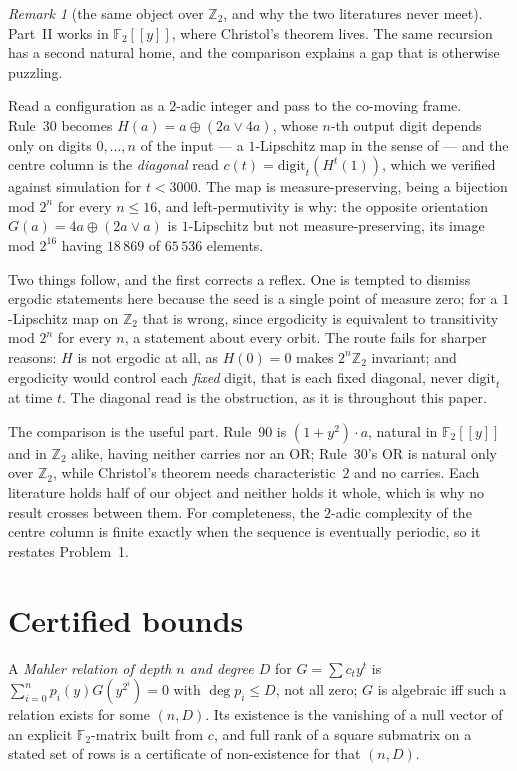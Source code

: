 \documentclass[11pt]{article}
\theoremstyle{definition}
\theoremstyle{remark}
\newtheorem{remark}[theorem]{Remark}
\newcommand{\Z}{\mathbb{Z}}
\newcommand{\F}{\mathbb{F}_2}
\begin{document}
\begin{remark}[the same object over $\Z_2$, and why the two literatures never meet]\label{du:padic}
Part~II works in $\F[[y]]$, where Christol's theorem lives. The same recursion has a second natural
home, and the comparison explains a gap that is otherwise puzzling.

Read a configuration as a $2$-adic integer and pass to the co-moving frame. Rule~30 becomes
$H(a)=a\oplus(2a\vee4a)$, whose $n$-th output digit depends only on digits $0,\dots,n$ of the input ---
a $1$-Lipschitz map in the sense of \cite{Anashin} --- and the centre column is the \emph{diagonal}
read $c(t)=\mathrm{digit}_t(H^{t}(1))$, which we verified against simulation for $t<3000$. The map is
measure-preserving, being a bijection mod $2^{n}$ for every $n\le16$, and left-permutivity is why: the
opposite orientation $G(a)=4a\oplus(2a\vee a)$ is $1$-Lipschitz but not measure-preserving, its image
mod $2^{16}$ having $18\,869$ of $65\,536$ elements.

Two things follow, and the first corrects a reflex. One is tempted to dismiss ergodic statements here
because the seed is a single point of measure zero; for a $1$-Lipschitz map on $\Z_2$ that is wrong,
since ergodicity is equivalent to transitivity mod $2^{n}$ for every $n$, a statement about every orbit.
The route fails for sharper reasons: $H$ is not ergodic at all, as $H(0)=0$ makes $2^{n}\Z_2$ invariant;
and ergodicity would control each \emph{fixed} digit, that is each fixed diagonal, never
$\mathrm{digit}_t$ at time $t$. The diagonal read is the obstruction, as it is throughout this paper.

The comparison is the useful part. Rule~90 is $(1+y^{2})\cdot a$, natural in $\F[[y]]$ and in $\Z_2$
alike, having neither carries nor an OR; Rule~30's OR is natural only over $\Z_2$, while Christol's
theorem needs characteristic~$2$ and no carries. Each literature holds half of our object and neither
holds it whole, which is why no result crosses between them. For completeness, the $2$-adic complexity
of the centre column is finite exactly when the sequence is eventually periodic, so it restates
Problem~1.
\end{remark}

\section{Certified bounds}\label{du:bounds}

A \emph{Mahler relation of depth $n$ and degree $D$} for $G=\sum c_ty^t$ is $\sum_{i=0}^np_i(y)G(y^{2^i})=0$ with $\deg p_i\le D$, not all zero; $G$ is algebraic iff such a relation exists for some $(n,D)$. Its existence is the vanishing of a null vector of an explicit $\F$-matrix built from $c$, and full rank of a square submatrix on a stated set of rows is a certificate of non-existence for that $(n,D)$.
\end{document}
